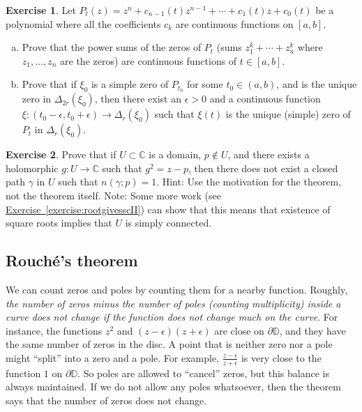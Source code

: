 \documentclass[12pt,openany]{book}
\newcommand{\C}{{\mathbb{C}}}
\newcommand{\D}{{\mathbb{D}}}
\newcommand{\myquote}[1]{``#1''}
\theoremstyle{plain}
\theoremstyle{remark}
\theoremstyle{definition}
\newenvironment{exbox}{%
    \def\FrameCommand{\vrule width 1pt \relax\hspace{10pt}}%
    \MakeFramed{\advance\hsize-\width\FrameRestore}%
}{%
    \endMakeFramed
}
\newenvironment{exparts}{%
    \leavevmode\begin{enumerate}[a),noitemsep,topsep=0pt,parsep=0pt,partopsep=0pt]
}{%
    \end{enumerate}
}
\theoremstyle{exercise}
\newtheorem{exercise}{Exercise}[section]
\theoremstyle{example}
\newcommand{\exerciseref}[1]{\hyperref[#1]{Exercise~\ref*{#1}}}
\begin{document}
\begin{exbox}
\begin{exercise}
Let $P_t(z) = z^n + c_{n-1}(t) z^{n-1} + \cdots + c_1(t) z + c_0(t)$
be a polynomial where all the coefficients $c_k$ are continuous functions
on $[a,b]$.
\begin{exparts}
\item
Prove that the power sums of the zeros of $P_t$
(sums $z_1^k+\cdots+z_n^k$ where $z_1,\ldots,z_n$ are the zeros)
are
continuous functions of $t \in [a,b]$.
\item
Prove that if $\xi_0$ is a simple zero of $P_{t_0}$ for some $t_0 \in (a,b)$,
and is the unique zero in
$\Delta_{2r}(\xi_0)$, then
there exist an $\epsilon > 0$ and a continuous function $\xi \colon
(t_0-\epsilon,t_0+\epsilon) \to \Delta_r(\xi_0)$ such that $\xi(t)$
is the unique (simple) zero of $P_t$ in $\Delta_r(\xi_0)$.
\end{exparts}
\end{exercise}

\begin{exercise} \label{exercise:rootgivesscI}
\pagebreak[3]
Prove that if $U \subset \C$ is a domain, $p \notin U$, and there
exists a holomorphic $g \colon U \to \C$ such that $g^2 = z-p$, then 
there does not exist a closed path $\gamma$ in $U$ such that $n(\gamma;p)=1$.
Hint: Use the motivation for the theorem, not the theorem itself.
Note: Some more work (see \exerciseref{exercise:rootgivesscII})
can show that this means that existence of
square roots implies that $U$ is simply connected.
\end{exercise}
\end{exbox}

\subsection{Rouch\'e's theorem}

We can count zeros and poles by counting them for a nearby function.
Roughly,
\emph{the number of zeros minus the
number of poles (counting multiplicity) inside a curve does not change
if the function does not change much on the curve}.
For instance, the functions $z^2$ and $(z-\epsilon)(z+\epsilon)$
are close on $\partial \D$, and they have the same number of
zeros in the disc.
A point that is neither zero nor a pole might \myquote{split} into a zero and a
pole. For example, $\frac{z-\epsilon}{z+\epsilon}$ is very close to the function
$1$ on $\partial \D$.  So poles are allowed to \myquote{cancel} zeros, but this
balance is always maintained.  If we do not allow any poles
whatsoever, then the theorem says that the number of zeros does not change.
\end{document}
